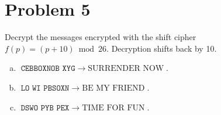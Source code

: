 \section*{Problem 5}

Decrypt the messages encrypted with the shift cipher \(f(p)=(p+10)\bmod 26\).
Decryption shifts back by 10.

\begin{enumerate}[(a)]
\item \(\texttt{CEBBOXNOB XYG} \;\to\; \boxed{\text{SURRENDER NOW}}\).
\item \(\texttt{LO WI PBSOXN} \;\to\; \boxed{\text{BE MY FRIEND}}\).
\item \(\texttt{DSWO PYB PEX} \;\to\; \boxed{\text{TIME FOR FUN}}\).
\end{enumerate}
